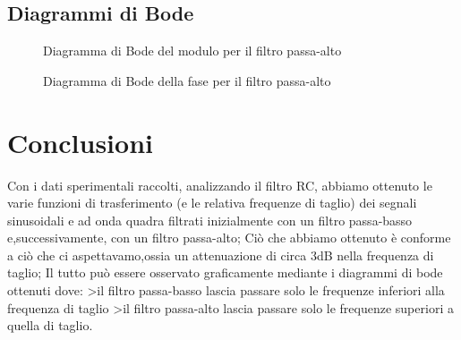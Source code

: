 \documentclass{article}
\begin{document}
\subsection{Diagrammi di Bode}

\begin{figure}[H]
  \caption{Diagramma di Bode del modulo per il filtro passa-alto}
\end{figure}
\begin{figure}[H]
  \caption{Diagramma di Bode della fase per il filtro passa-alto}
\end{figure}

\section{Conclusioni}
Con i dati sperimentali raccolti, analizzando il filtro RC, abbiamo ottenuto le varie funzioni di trasferimento 
(e le relativa frequenze di taglio) dei segnali sinusoidali e ad onda quadra filtrati inizialmente 
con un filtro passa-basso e,successivamente, con un filtro passa-alto; Ciò che abbiamo 
ottenuto è conforme a ciò che ci aspettavamo,ossia un attenuazione di circa 3dB nella
frequenza di taglio; Il tutto può essere osservato graficamente mediante i diagrammi
di bode ottenuti dove:
>il filtro passa-basso lascia passare solo le frequenze inferiori alla frequenza  di taglio
>il filtro passa-alto lascia passare solo le frequenze superiori a quella di taglio.
\end{document}
